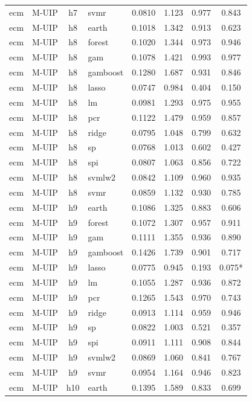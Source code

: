 \begin{ThreePartTable}
\begin{longtable}[t]{llclcccc}
ecm & M-UIP & h7 & svmr & 0.0810 & 1.123 & 0.977 & 0.843\\
\addlinespace
ecm & M-UIP & h8 & earth & 0.1018 & 1.342 & 0.913 & 0.623\\
ecm & M-UIP & h8 & forest & 0.1020 & 1.344 & 0.973 & 0.946\\
ecm & M-UIP & h8 & gam & 0.1078 & 1.421 & 0.993 & 0.977\\
ecm & M-UIP & h8 & gamboost & 0.1280 & 1.687 & 0.931 & 0.846\\
ecm & M-UIP & h8 & lasso & 0.0747 & 0.984 & 0.404 & 0.150\\
ecm & M-UIP & h8 & lm & 0.0981 & 1.293 & 0.975 & 0.955\\
ecm & M-UIP & h8 & pcr & 0.1122 & 1.479 & 0.959 & 0.857\\
ecm & M-UIP & h8 & ridge & 0.0795 & 1.048 & 0.799 & 0.632\\
ecm & M-UIP & h8 & sp & 0.0768 & 1.013 & 0.602 & 0.427\\
ecm & M-UIP & h8 & spi & 0.0807 & 1.063 & 0.856 & 0.722\\
ecm & M-UIP & h8 & svmlw2 & 0.0842 & 1.109 & 0.960 & 0.935\\
ecm & M-UIP & h8 & svmr & 0.0859 & 1.132 & 0.930 & 0.785\\
\addlinespace
ecm & M-UIP & h9 & earth & 0.1086 & 1.325 & 0.883 & 0.606\\
ecm & M-UIP & h9 & forest & 0.1072 & 1.307 & 0.957 & 0.911\\
ecm & M-UIP & h9 & gam & 0.1111 & 1.355 & 0.936 & 0.890\\
ecm & M-UIP & h9 & gamboost & 0.1426 & 1.739 & 0.901 & 0.717\\
ecm & M-UIP & h9 & lasso & 0.0775 & 0.945 & 0.193 & 0.075*\\
ecm & M-UIP & h9 & lm & 0.1055 & 1.287 & 0.936 & 0.872\\
ecm & M-UIP & h9 & pcr & 0.1265 & 1.543 & 0.970 & 0.743\\
ecm & M-UIP & h9 & ridge & 0.0913 & 1.114 & 0.959 & 0.946\\
ecm & M-UIP & h9 & sp & 0.0822 & 1.003 & 0.521 & 0.357\\
ecm & M-UIP & h9 & spi & 0.0911 & 1.111 & 0.908 & 0.844\\
ecm & M-UIP & h9 & svmlw2 & 0.0869 & 1.060 & 0.841 & 0.767\\
ecm & M-UIP & h9 & svmr & 0.0954 & 1.164 & 0.946 & 0.823\\
\addlinespace
ecm & M-UIP & h10 & earth & 0.1395 & 1.589 & 0.833 & 0.699\\

\end{longtable}
\end{ThreePartTable}
